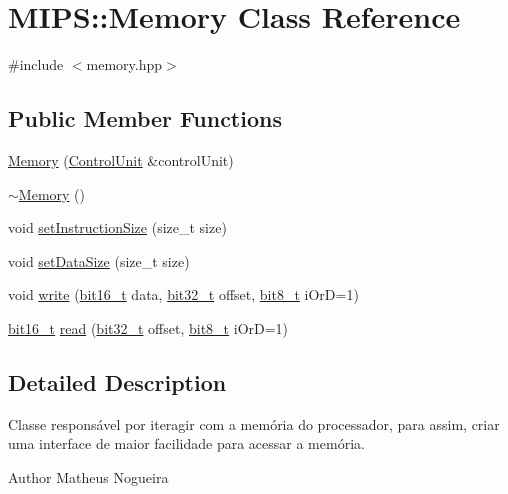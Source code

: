 \hypertarget{classMIPS_1_1Memory}{}\section{M\+I\+PS\+:\+:Memory Class Reference}
\label{classMIPS_1_1Memory}


{\ttfamily \#include $<$memory.\+hpp$>$}

\subsection*{Public Member Functions}
\begin{DoxyCompactItemize}
\item 
\hyperlink{classMIPS_1_1Memory_a092aefef9b57b4a349fb11a780f1cc5a}{Memory} (\hyperlink{classMIPS_1_1ControlUnit}{Control\+Unit} \&control\+Unit)
\item 
\hyperlink{classMIPS_1_1Memory_ace3e886fa42efa3e629c7572bf232e05}{$\sim$\+Memory} ()
\item 
void \hyperlink{classMIPS_1_1Memory_a636e0ca3d23fc5022a2a4b59a6648210}{set\+Instruction\+Size} (size\+\_\+t size)
\item 
void \hyperlink{classMIPS_1_1Memory_a53b03b417ee8efb4a6f3a0020c3bd7ab}{set\+Data\+Size} (size\+\_\+t size)
\item 
void \hyperlink{classMIPS_1_1Memory_a8d339b30f29c4dc8044b51c982d5e95b}{write} (\hyperlink{core_8hpp_adc265a970bc35995b5879784bbb3f1b7}{bit16\+\_\+t} data, \hyperlink{core_8hpp_ad5f4c6ca614f67be232930e0e31b9ccc}{bit32\+\_\+t} offset, \hyperlink{core_8hpp_a6074bae122ae7b527864eec42c728c3c}{bit8\+\_\+t} i\+OrD=1)
\item 
\hyperlink{core_8hpp_adc265a970bc35995b5879784bbb3f1b7}{bit16\+\_\+t} \hyperlink{classMIPS_1_1Memory_a93a2aecd6026ecd86e77fcef6b99b91b}{read} (\hyperlink{core_8hpp_ad5f4c6ca614f67be232930e0e31b9ccc}{bit32\+\_\+t} offset, \hyperlink{core_8hpp_a6074bae122ae7b527864eec42c728c3c}{bit8\+\_\+t} i\+OrD=1)
\end{DoxyCompactItemize}


\subsection{Detailed Description}
Classe responsável por iteragir com a memória do processador, para assim, criar uma interface de maior facilidade para acessar a memória.

\begin{DoxyAuthor}{Author}
Matheus Nogueira 
\end{DoxyAuthor}


